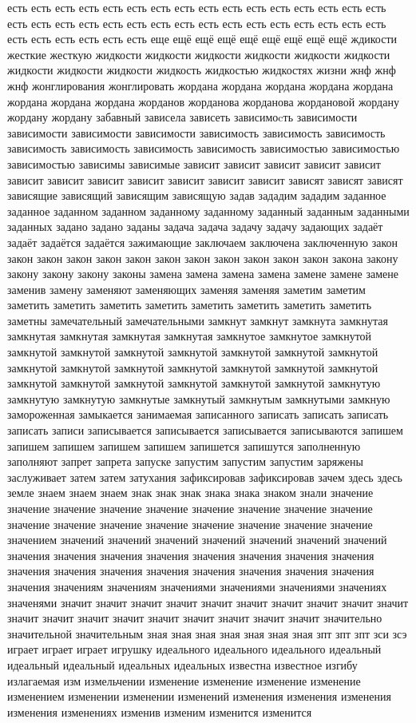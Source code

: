 есть есть есть есть есть есть есть есть есть есть есть есть есть есть есть есть есть есть есть есть есть есть есть есть есть есть есть есть есть есть есть есть есть есть есть есть есть есть еще ещё ещё ещё ещё ещё ещё ещё ещё ждикости жесткие жесткую жидкости жидкости жидкости жидкости жидкости жидкости жидкости жидкости жидкости жидкость жидкостью жидкостях жизни жнф жнф жнф жонглирования жонглировать жордана жордана жордана жордана жордана жордана жордана жордана жорданов жорданова жорданова жордановой жордану жордану жордану забавный зависела зависеть зависимоcть зависимости зависимости зависимости зависимости зависимость зависимость зависимость зависимость зависимость зависимость зависимость зависимостью зависимостью зависимостью зависимы зависимые зависит зависит зависит зависит зависит зависит зависит зависит зависит зависит зависит зависит зависят зависят зависят зависящие зависящий зависящим зависящую задав зададим зададим заданное заданное заданном заданном заданному заданному заданный заданным заданными заданных задано задано заданы задача задача задачу задачу задающих задаёт задаёт задаётся задаётся зажимающие заключаем заключена заключенную закон закон закон закон закон закон закон закон закон закон закон закон закона закону закону закону закону законы замена замена замена замена замене замене замене заменив замену заменяют заменяющих заменяя заменяя заметим заметим заметить заметить заметить заметить заметить заметить заметить заметить заметны замечательный замечательными замкнут замкнут замкнута замкнутая замкнутая замкнутая замкнутая замкнутая замкнутое замкнутое замкнутой замкнутой замкнутой замкнутой замкнутой замкнутой замкнутой замкнутой замкнутой замкнутой замкнутой замкнутой замкнутой замкнутой замкнутой замкнутой замкнутой замкнутой замкнутой замкнутой замкнутой замкнутую замкнутую замкнутую замкнутые замкнутый замкнутым замкнутыми замкную замороженная замыкается занимаемая записанного записать записать записать записать записи записывается записывается записывается записываются запишем запишем запишем запишем запишем запишется запишутся заполненную заполняют запрет запрета запуске запустим запустим запустим заряжены заслуживает затем затем затухания зафиксировав зафиксировав зачем здесь здесь земле знаем знаем знаем знак знак знак знака знака знаком знали значение значение значение значение значение значение значение значение значение значение значение значение значение значение значение значение значение значением значений значений значений значений значений значений значений значения значения значения значения значения значения значения значения значения значения значения значения значения значения значения значения значения значениям значениям значениями значениями значениями значениях значенями значит значит значит значит значит значит значит значит значит значит значит значит значит значит значит значит значит значит значит значительно значительной значительным зная зная зная зная зная зная зная зпт зпт зпт зси зсэ играет играет играет игрушку идеального идеального идеального идеальный идеальный идеальный идеальных идеальных известна известное изгибу излагаемая изм измельчении изменение изменение изменение изменение изменением изменении изменении изменений изменения изменения изменения изменения изменениях изменив изменим изменится изменится 